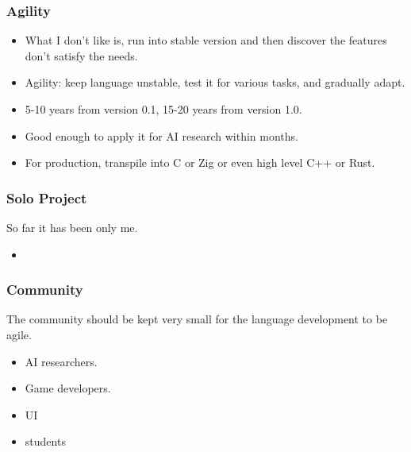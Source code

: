 \documentclass{beamer}   	%
\theoremstyle{definition}
\begin{document}
\begin{frame}
\frametitle{Agility}
\begin{itemize}
	\item What I don't like is, run into stable version and then discover the features don't satisfy the needs.
	\item Agility: keep language unstable, test it for various tasks, and gradually adapt.
	\item 5-10 years from version 0.1, 15-20 years from version 1.0.
	\item Good enough to apply it for AI research within months.
	\item For production, transpile into C or Zig or even high level C++ or Rust.
\end{itemize}
\end{frame}

\begin{frame}
\frametitle{Solo Project}

So far it has been only me.

\begin{itemize}
	\item 
\end{itemize}
\end{frame}

\begin{frame}
\frametitle{Community}

The community should be kept very small for the language development to be agile.
\begin{itemize}
	\item AI researchers.
	\item Game developers.
	\item UI
	\item students
\end{itemize}
\end{frame}
\end{document}
